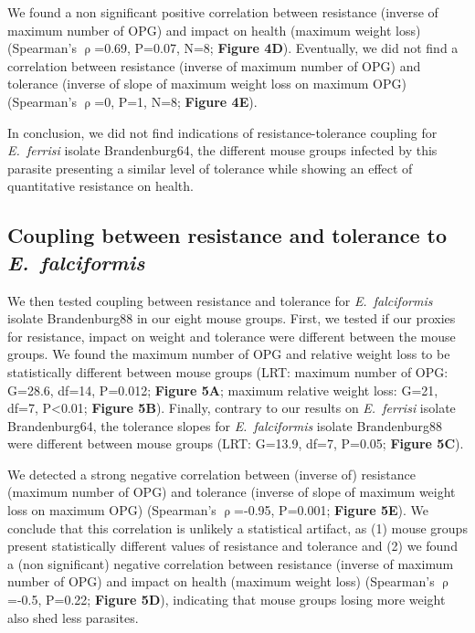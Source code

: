 \documentclass[12pt]{article}
\begin{document}
We found a non significant positive correlation between resistance (inverse of maximum number of OPG) and impact on health (maximum weight loss) (Spearman's $\uprho$=0.69, P=0.07, N=8; \textbf{Figure 4D}). Eventually, we did not find a correlation between resistance (inverse of maximum number of OPG) and tolerance (inverse of slope of maximum weight loss on maximum OPG) (Spearman's $\uprho$=0, P=1, N=8; \textbf{Figure 4E}). \par

In conclusion, we did not find indications of resistance-tolerance coupling for \textit{E.~ferrisi} isolate Brandenburg64, the different mouse groups infected by this parasite presenting a similar level of tolerance while showing an effect of quantitative resistance on health.\par

\subsection{Coupling between resistance and tolerance to \textit{E.~falciformis}}

We then tested coupling between resistance and tolerance for \textit{E.~falciformis} isolate Brandenburg88 in our eight mouse groups. First, we tested if our proxies for resistance, impact on weight and tolerance were different between the mouse groups. We found the maximum number of OPG and relative weight loss to be statistically different between mouse groups (LRT: maximum number of OPG: G=28.6, df=14, P=0.012; \textbf{Figure 5A}; maximum relative weight loss: G=21, df=7, P<0.01; \textbf{Figure 5B}). Finally, contrary to our results on \textit{E.~ferrisi} isolate Brandenburg64, the tolerance slopes for \textit{E.~falciformis} isolate Brandenburg88 were different between mouse groups (LRT: G=13.9, df=7, P=0.05; \textbf{Figure 5C}).\par

We detected a strong negative correlation between (inverse of) resistance (maximum number of OPG) and tolerance (inverse of slope of maximum weight loss on maximum OPG) (Spearman's $\uprho$=-0.95, P=0.001; \textbf{Figure 5E}). We conclude that this correlation is unlikely a statistical artifact, as (1) mouse groups present statistically different values of resistance and tolerance and (2) we found a (non significant) negative correlation between resistance (inverse of maximum number of OPG) and impact on health (maximum weight loss) (Spearman's $\uprho$=-0.5, P=0.22; \textbf{Figure 5D}), indicating that mouse groups losing more weight also shed less parasites. \par
\end{document}
